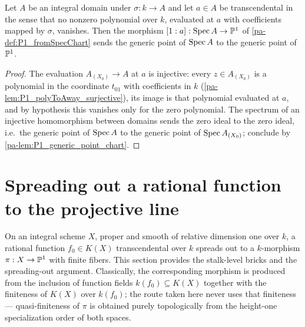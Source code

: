 \begin{theorem}
  \label{pa-thm:P1_fromSpecChart_generic}
  \leanok

  Let \(A\) be an integral domain under \(\sigma : k \to A\) and let \(a \in A\) be
  transcendental in the sense that no nonzero polynomial over \(k\), evaluated at \(a\)
  with coefficients mapped by \(\sigma\), vanishes. Then the morphism
  \([1 : a] : \operatorname{Spec} A \to \mathbb{P}^1\) of \ref{pa-def:P1_fromSpecChart} sends the generic point of
  \(\operatorname{Spec} A\) to the generic point of \(\mathbb{P}^1\).
\end{theorem}
\begin{proof}
  \leanok
  The evaluation \(A_{(X_0)} \to A\) at \(a\) is injective: every \(z \in A_{(X_0)}\) is a
  polynomial in the coordinate \(t_{01}\) with coefficients in \(k\)
  (\ref{pa-lem:P1_polyToAway_surjective}), its image is that polynomial evaluated at \(a\),
  and by hypothesis this vanishes only for the zero polynomial. The spectrum of an
  injective homomorphism between domains sends the zero ideal to the zero ideal, i.e.\ the
  generic point of \(\operatorname{Spec} A\) to the generic point of \(\operatorname{Spec} A_{(X_0)}\); conclude by
  \ref{pa-lem:P1_generic_point_chart}.
\end{proof}

\section{Spreading out a rational function to the projective line}

On an integral scheme \(X\), proper and smooth of relative dimension one over \(k\), a
rational function \(f_0 \in K(X)\) transcendental over \(k\) spreads out to a
\(k\)-morphism \(\pi : X \to \mathbb{P}^1\) with finite fibers. This section provides the
stalk-level bricks and the spreading-out argument. Classically, the corresponding morphism
is produced from the inclusion of function fields \(k(f_0) \subseteq K(X)\) together with
the finiteness of \(K(X)\) over \(k(f_0)\); the route taken here never uses that
finiteness --- quasi-finiteness of \(\pi\) is obtained purely topologically from the
height-one specialization order of both spaces.

